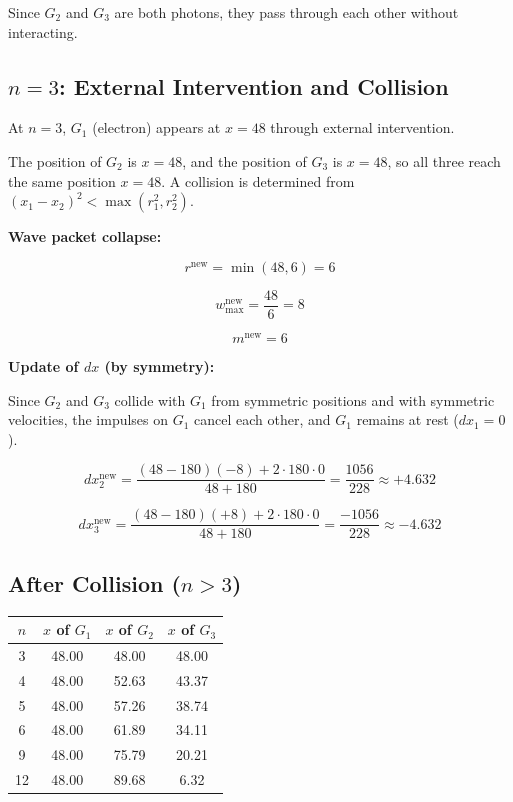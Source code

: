 \documentclass[12pt,a4paper]{article}
\begin{document}
Since $G_2$ and $G_3$ are both photons, they pass through each other without interacting.

\subsection{$n = 3$: External Intervention and Collision}

At $n = 3$, $G_1$ (electron) appears at $x = 48$ through external intervention.

The position of $G_2$ is $x = 48$, and the position of $G_3$ is $x = 48$, so all three reach the same position $x = 48$. A collision is determined from $(x_1 - x_2)^2 < \max(r_1^2, r_2^2)$.

\textbf{Wave packet collapse:}

\begin{equation}
  r^{\text{new}} = \min(48, 6) = 6
\end{equation}

\begin{equation}
  w_{\max}^{\text{new}} = \frac{48}{6} = 8
\end{equation}

\begin{equation}
  m^{\text{new}} = 6
\end{equation}

\textbf{Update of $dx$ (by symmetry):}

Since $G_2$ and $G_3$ collide with $G_1$ from symmetric positions and with symmetric velocities, the impulses on $G_1$ cancel each other, and $G_1$ remains at rest ($dx_1 = 0$).

\begin{equation}
  dx_2^{\text{new}} = \frac{(48 - 180)(-8) + 2 \cdot 180 \cdot 0}{48 + 180} = \frac{1056}{228} \approx +4.632
\end{equation}

\begin{equation}
  dx_3^{\text{new}} = \frac{(48 - 180)(+8) + 2 \cdot 180 \cdot 0}{48 + 180} = \frac{-1056}{228} \approx -4.632
\end{equation}

\subsection{After Collision ($n > 3$)}

\begin{table}[h]
\centering
\begin{tabular}{@{}cccc@{}}
\toprule
$n$ & $x$ of $G_1$ & $x$ of $G_2$ & $x$ of $G_3$ \\
\midrule
3  & 48.00 & 48.00 & 48.00 \\
4  & 48.00 & 52.63 & 43.37 \\
5  & 48.00 & 57.26 & 38.74 \\
6  & 48.00 & 61.89 & 34.11 \\
9  & 48.00 & 75.79 & 20.21 \\
12 & 48.00 & 89.68 &  6.32 \\
\bottomrule
\end{tabular}
\end{table}
\end{document}
